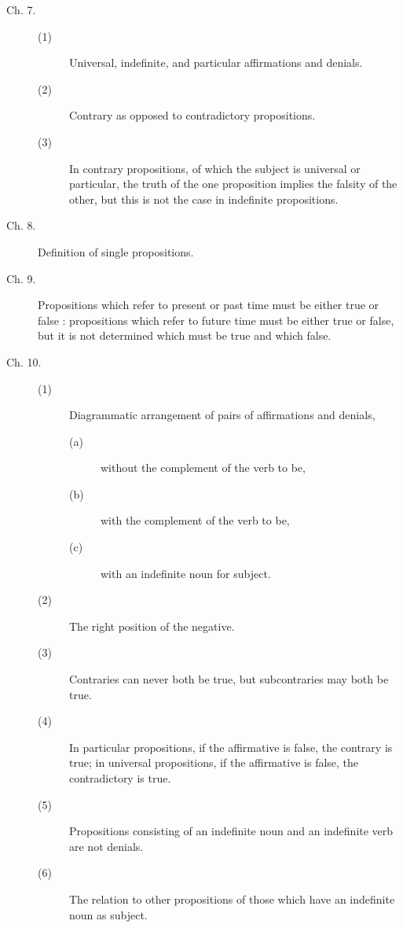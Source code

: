 \begin{description}
\item[Ch. 7.]
\begin{description}
\item[(1)] Universal, indefinite, and particular affirmations and denials. 

\item[(2)] Contrary as opposed to contradictory propositions. 

\item[(3)] In contrary propositions, of which the subject is universal or particular,
  the truth of the one proposition implies the falsity of the other,
  but this is not the case in indefinite propositions. 
\end{description}

\item[Ch. 8.]
Definition of single propositions. 

\item[Ch. 9.] Propositions which refer to present or past time must be either true or false :
  propositions which refer to future time must be either true or false,
  but it is not determined which must be true and which false. 

\item[Ch. 10.]
\begin{description}
 \item[(1)] Diagrammatic arrangement of pairs of affirmations and denials,
\begin{description}
\item[(a)] without the complement of the verb to be,
\item[(b)] with the complement of the verb to be,
\item[(c)] with an indefinite noun for subject. 
\end{description}

\item[(2)] The right position of the negative. 

\item[(3)] Contraries can never both be true, but subcontraries may both be true. 

\item[(4)] In particular propositions, if the affirmative is false, the contrary is true;
  in universal propositions, if the affirmative is false, the contradictory is true. 

\item[(5)] Propositions consisting of an indefinite noun and an indefinite verb are not denials. 

\item[(6)] The relation to other propositions of those which have an indefinite noun as subject. 


\end{description}
\end{description}
